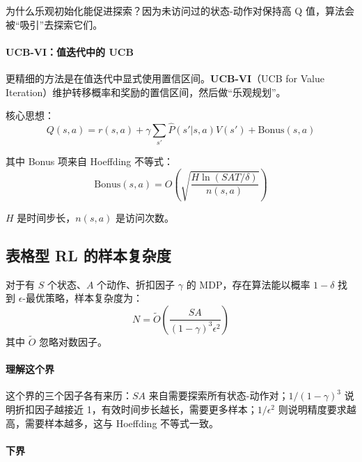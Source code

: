 为什么乐观初始化能促进探索？因为未访问过的状态-动作对保持高 Q 值，算法会被“吸引”去探索它们。

\paragraph{UCB-VI：值迭代中的 UCB}

更精细的方法是在值迭代中显式使用置信区间。\textbf{UCB-VI}（UCB for Value Iteration）维护转移概率和奖励的置信区间，然后做“乐观规划”。

核心思想：
\begin{equation}
    Q(s,a) = r(s,a) + \gamma \sum_{s'} \hat{P}(s'|s,a) V(s') + \text{Bonus}(s,a)
\end{equation}

其中 Bonus 项来自 Hoeffding 不等式：
\begin{equation}
    \text{Bonus}(s,a) = O\left(\sqrt{\frac{H \ln(SAT/\delta)}{n(s,a)}}\right)
\end{equation}

$H$ 是时间步长，$n(s,a)$ 是访问次数。

\subsection{表格型 RL 的样本复杂度}

\begin{theorem}
对于有 $S$ 个状态、$A$ 个动作、折扣因子 $\gamma$ 的 MDP，存在算法能以概率 $1-\delta$ 找到 $\epsilon$-最优策略，样本复杂度为：
\begin{equation}
    N = \tilde{O}\left( \frac{SA}{(1-\gamma)^3 \epsilon^2} \right)
\end{equation}
其中 $\tilde{O}$ 忽略对数因子。
\end{theorem}

\paragraph{理解这个界}
这个界的三个因子各有来历：$SA$ 来自需要探索所有状态-动作对；$1/(1-\gamma)^3$ 说明折扣因子越接近 1，有效时间步长越长，需要更多样本；$1/\epsilon^2$ 则说明精度要求越高，需要样本越多，这与 Hoeffding 不等式一致。

\paragraph{下界}

